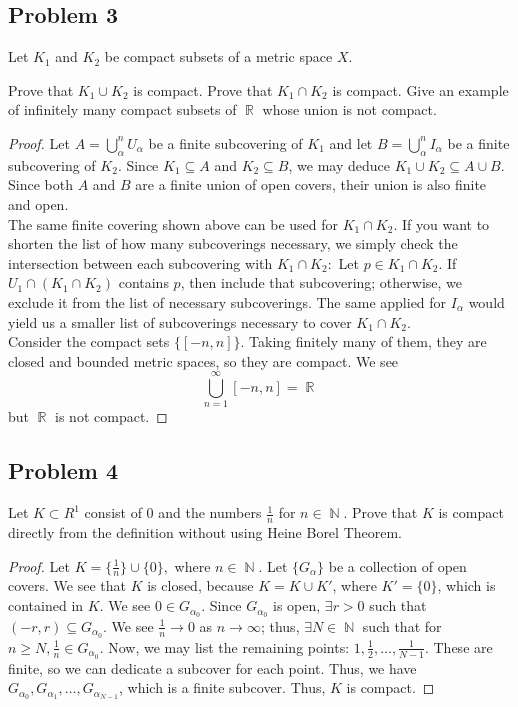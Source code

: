 \documentclass{amsart}
\DeclareMathOperator*{\R}{\mathbb{R}}
\DeclareMathOperator{\N}{\mathbb{N}}
\begin{document}
\subsection*{Problem 3} Let $K_1$ and $K_2$ be compact subsets of a metric space $X$. 
\begin{tasks}
\task Prove that $K_1 \cup K_2$ is compact.
\task Prove that $K_1 \cap K_2$ is compact.
\task Give an example of infinitely many compact subsets of $\R$ whose union is not compact.
\end{tasks}
\begin{proof}
    Let $A = \bigcup_{\alpha}^n U_\alpha$ be a finite subcovering of $K_1$ and let $B = \bigcup_{\alpha}^n I_\alpha$ be a finite subcovering of $K_2$. Since $K_1 \subseteq A$ and $K_2 \subseteq B$, we may deduce $K_1 \cup K_2 \subseteq A \cup B$. Since both $A$ and $B$ are a finite union of open covers, their union is also finite and open. \\
    The same finite covering shown above can be used for $K_1 \cap K_2$. If you want to shorten the list of how many subcoverings necessary, we simply check the intersection between each subcovering with $K_1 \cap K_2:$ Let $p \in K_1 \cap K_2$. If $U_1 \cap (K_1 \cap K_2)$ contains $p$, then include that subcovering; otherwise, we exclude it from the list of necessary subcoverings. The same applied for $I_\alpha$ would yield us a smaller list of subcoverings necessary to cover $K_1 \cap K_2$. \\
    Consider the compact sets $\{[-n,n]\}$. Taking finitely many of them, they are closed and bounded metric spaces, so they are compact. We see 
    \[\bigcup_{n=1}^\infty [-n,n] = \R\]
    but $\R$ is not compact. 
\end{proof}
\subsection*{Problem 4} Let $K \subset R^1$ consist of 0 and the numbers $\frac{1}{n}$ for $n \in \N$. Prove that $K$ is compact directly from the definition without using Heine Borel Theorem. 
\begin{proof}
    Let $K = \{\frac{1}{n}\} \cup \{0\},$ where $n \in \N$. Let $\{G_\alpha\}$ be a collection of open covers. We see that $K$ is closed, because $K = K \cup K'$, where $K' = \{0\}$, which is contained in $K$. We see $0 \in G_{\alpha_0}$. Since $G_{\alpha_0}$ is open, $\exists r > 0$ such that $(-r,r) \subseteq G_{\alpha_0}$. We see $\frac{1}{n} \to 0$ as $n \to \infty$; thus, $\exists N \in \N$ such that for $n \geq N, \frac{1}{n} \in G_{\alpha_0}$. Now, we may list the remaining points: $1,\frac{1}{2},\ldots, \frac{1}{N-1}$. These are finite, so we can dedicate a subcover for each point. Thus, we have $G_{\alpha_0},G_{\alpha_1},\ldots,G_{\alpha_{N-1}}$, which is a finite subcover. Thus, $K$ is compact. 
\end{proof}
\end{document}
